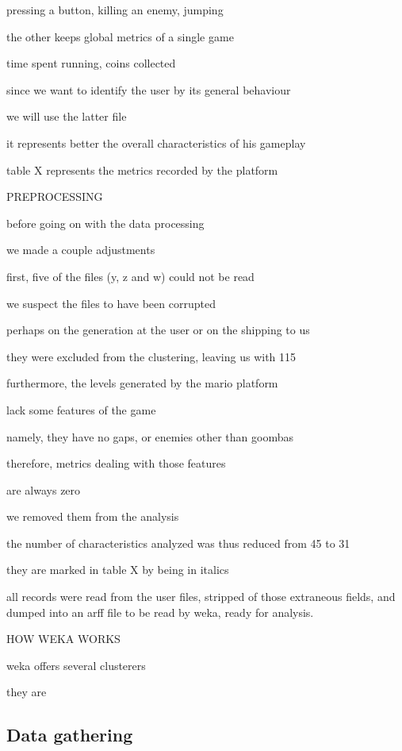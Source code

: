 pressing a button, killing an enemy, jumping

the other keeps global metrics of a single game

time spent running, coins collected

since we want to identify the user by its general behaviour

we will use the latter file

it represents better the overall characteristics of his gameplay

table X represents the metrics recorded by the platform

PREPROCESSING

before going on with the data processing

we made a couple adjustments

first, five of the files (y, z and w) could not be read

we suspect the files to have been corrupted

perhaps on the generation at the user or on the shipping to us

they were excluded from the clustering, leaving us with 115

furthermore, the levels generated by the mario platform

lack some features of the game

namely, they have no gaps, or enemies other than goombas

therefore, metrics dealing with those features

are always zero

we removed them from the analysis

the number of characteristics analyzed was thus reduced from 45 to 31

they are marked in table X by being in italics

all records were read from the user files, stripped of those extraneous fields, and dumped into an arff file to be read by weka, ready for analysis.

HOW WEKA WORKS

weka offers several clusterers

they are



\subsection{Data gathering}

